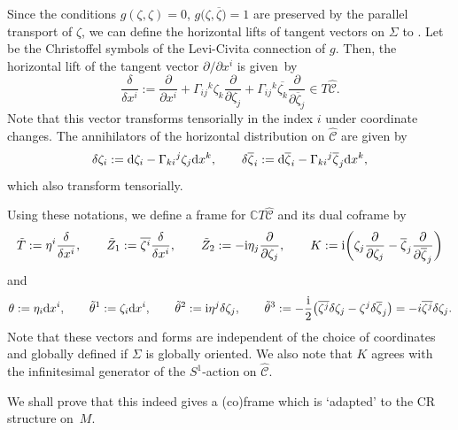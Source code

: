 \documentclass[pdftex]{sigma}
\renewcommand\d{\delta}
\renewcommand\th{\theta}
\newcommand\ol{\overline}
\newcommand{\wh}{\widehat}
\numberwithin{equation}{section}
\begin{document}
Since the conditions $g(\zeta, \zeta)=0$, $g\bigl(\zeta, \ol\zeta\bigr)=1$ are preserved by the parallel transport of $\zeta$, we can define the horizontal lifts of tangent vectors on $\Sigma$ to \smash{$\wh{\mathcal{C}}$}. Let  be the Christoffel symbols of the Levi-Civita connection of $g$. Then, the horizontal lift of the tangent vector $\partial/\partial x^i$ is given~by
\[
\frac{\d}{\d x^i}:=\frac{\partial}{\partial x^i}+\Gamma_{ij}{}^k\zeta_k\frac{\partial}{\partial \zeta_j}+\Gamma_{ij}{}^k\ol{\zeta_k}\frac{\partial}{\partial \ol{\zeta}_j}\in T\wh{\mathcal{C}}.
\]
Note that this vector transforms tensorially in the index $i$ under coordinate changes. The annihilators of the horizontal distribution on $\wh{\mathcal{C}}$ are given by
\[
\d \zeta_i:={\rm d}\zeta_i-\Gamma_{ki}{}^j \zeta_j {\rm d}x^k, \qquad \d \ol{\zeta}_i:={\rm d}\ol{\zeta}_i-\Gamma_{ki}{}^j \ol{\zeta}_j {\rm d}x^k,
\]
which also transform tensorially.

Using these notations, we define a frame
\smash{$\bigl(\tilde T, \tilde Z_1, \tilde Z_2, \tilde Z_{\ol1}, \tilde Z_{\ol2}, K\bigr)$}
 for $\mathbb{C}T\wh{\mathcal{C}}$ and its dual coframe \smash{$\bigl(\th, \tilde\th^1, \tilde\th^2, \tilde\th^{\ol1}, \tilde\th^{\ol2}, \tilde\th^3\bigr)$} by
\[
\tilde T:=\eta^i \frac{\d}{\d x^i}, \qquad \tilde Z_1:=\ol{\zeta^i}\frac{\d}{\d x^i}, \qquad \tilde Z_2:=-{\rm i}\eta_j\frac{\partial}{\partial \zeta_j}, \qquad
K:={\rm i}\biggl(\zeta_j\frac{\partial}{\partial \zeta_j}
-\ol{\zeta}_j\frac{\partial}{\partial \ol{\zeta}_j}\biggr)
\]
and
\[
\th:=\eta_i {\rm d}x^i, \qquad \tilde\th^1:=\zeta_i {\rm d}x^i, \qquad \tilde\th^2:={\rm i}\eta^j\d\zeta_j, \qquad \tilde\th^3:=-\frac{{\rm i}}{2}\bigl(\ol{\zeta^j}\d\zeta_j-\zeta^j\d\ol{\zeta}_j\bigr)=-i\ol{\zeta^j}\d\zeta_j.
\]
Note that these vectors and forms are independent of the choice of coordinates and globally defined if $\Sigma$ is globally oriented. We also note that $K$ agrees with the infinitesimal generator of the $S^1$-action on $\wh{\mathcal{C}}$.

We shall prove that this indeed gives a (co)frame which is `adapted' to the CR structure on~$M$.
\end{document}
